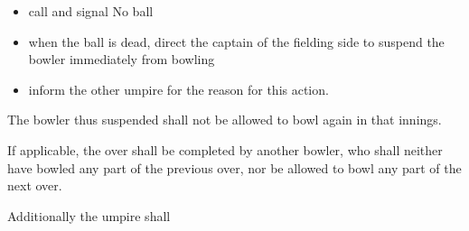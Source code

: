 \documentclass[12pt]{article}
\begin{document}
\vspace{\baselineskip}
\begin{itemize}
	\item {\fontsize{9pt}{10.8pt}\selectfont call and signal No ball\par}\par


\vspace{\baselineskip}
	\item {\fontsize{9pt}{10.8pt}\selectfont when the ball is dead, direct the captain of the fielding side to suspend the bowler immediately from bowling\par}\par


\vspace{\baselineskip}
	\item {\fontsize{9pt}{10.8pt}\selectfont inform the other umpire for the reason for this action.\par}
\end{itemize}\par


\vspace{\baselineskip}
\begin{adjustwidth}{0.5in}{0.0in}
{\fontsize{9pt}{10.8pt}\selectfont The bowler thus suspended shall not be allowed to bowl again in that innings.\par}\par

\end{adjustwidth}


\vspace{\baselineskip}
\begin{adjustwidth}{0.5in}{0.12in}
{\fontsize{9pt}{10.8pt}\selectfont If applicable, the over shall be completed by another bowler, who shall neither have bowled any part of the previous over, nor be allowed to bowl any part of the next over.\par}\par

\end{adjustwidth}


\vspace{\baselineskip}
\begin{adjustwidth}{0.5in}{0.0in}
{\fontsize{9pt}{10.8pt}\selectfont Additionally the umpire shall\par}\par

\end{adjustwidth}
\end{document}
